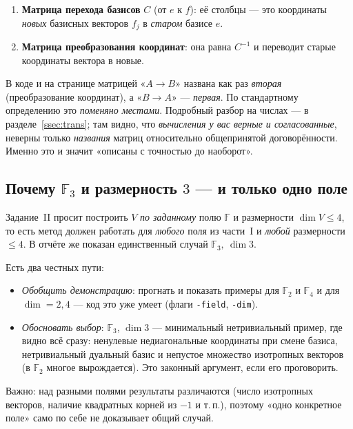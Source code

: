 \documentclass[11pt]{article}
\newcommand{\F}{\mathbb{F}}
\begin{document}
\begin{enumerate}[leftmargin=1.6em]
  \item \textbf{Матрица перехода базисов} $C$ (от $e$ к $f$): её столбцы — это
        координаты \emph{новых} базисных векторов $f_j$ в \emph{старом} базисе $e$.
  \item \textbf{Матрица преобразования координат}: она равна $C^{-1}$ и переводит
        старые координаты вектора в новые.
\end{enumerate}

В коде и на странице матрицей «$A\to B$» названа как раз \emph{вторая} (преобразование
координат), а «$B\to A$» — \emph{первая}. По стандартному определению это \emph{поменяно
местами}. Подробный разбор на числах — в разделе~\ref{ssec:trans}; там видно, что
\emph{вычисления у вас верные и согласованные}, неверны только \emph{названия} матриц
относительно общепринятой договорённости. Именно это и значит «описаны с точностью до
наоборот».

\subsection{Почему $\F_3$ и размерность $3$ — и только одно поле}

Задание~II просит построить $V$ \emph{по заданному} полю $\F$ и размерности $\dim V\le 4$,
то есть метод должен работать для \emph{любого} поля из части~I и \emph{любой} размерности
$\le 4$. В отчёте же показан единственный случай $\F_3,\ \dim 3$.

\begin{idea}
Есть два честных пути:
\begin{itemize}[leftmargin=1.4em]
  \item \emph{Обобщить демонстрацию}: прогнать и показать примеры для $\F_2$ и $\F_4$ и
        для $\dim=2,4$ — код это уже умеет (флаги \texttt{-field}, \texttt{-dim}).
  \item \emph{Обосновать выбор}: $\F_3$, $\dim 3$ — минимальный нетривиальный пример,
        где видно всё сразу: ненулевые недиагональные координаты при смене базиса,
        нетривиальный дуальный базис и непустое множество изотропных векторов
        (в $\F_2$ многое вырождается). Это законный аргумент, если его проговорить.
\end{itemize}
Важно: над разными полями результаты различаются (число изотропных векторов, наличие
квадратных корней из $-1$ и т.\,п.), поэтому «одно конкретное поле» само по себе не доказывает
общий случай.
\end{idea}
\end{document}
